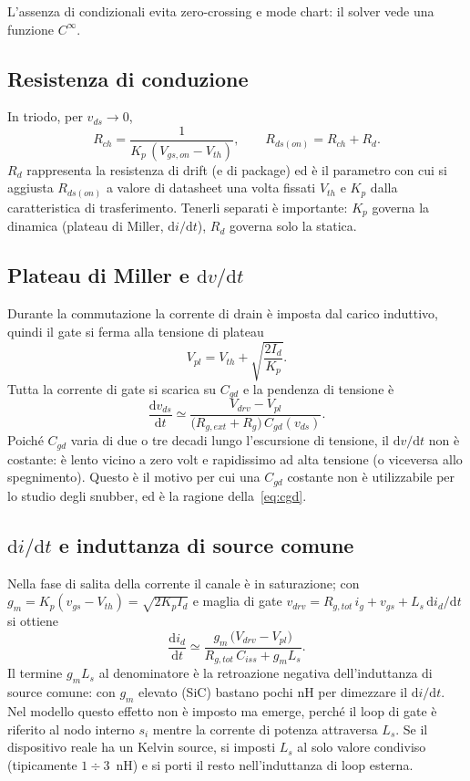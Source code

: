 \documentclass[11pt,a4paper]{article}
\newcommand{\ud}{\mathrm{d}}
\begin{document}
L'assenza di condizionali evita zero-crossing e mode chart: il solver vede
una funzione $C^\infty$.

\subsection{Resistenza di conduzione}

In triodo, per $v_{ds}\to 0$,
\begin{equation}
  R_{ch}=\frac{1}{K_p\,(V_{gs,on}-V_{th})},
  \qquad
  R_{ds(on)}=R_{ch}+R_d .
\end{equation}
$R_d$ rappresenta la resistenza di drift (e di package) ed è il parametro
con cui si aggiusta $R_{ds(on)}$ a valore di datasheet una volta fissati
$V_{th}$ e $K_p$ dalla caratteristica di trasferimento. Tenerli separati è
importante: $K_p$ governa la dinamica (plateau di Miller, $\ud i/\ud t$),
$R_d$ governa solo la statica.

\subsection{Plateau di Miller e $\ud v/\ud t$}

Durante la commutazione la corrente di drain è imposta dal carico
induttivo, quindi il gate si ferma alla tensione di plateau
\begin{equation}
  V_{pl}=V_{th}+\sqrt{\frac{2 I_d}{K_p}} .
  \label{eq:vpl}
\end{equation}
Tutta la corrente di gate si scarica su $C_{gd}$ e la pendenza di tensione è
\begin{equation}
  \frac{\ud v_{ds}}{\ud t}\simeq
  \frac{V_{drv}-V_{pl}}{\big(R_{g,ext}+R_g\big)\,C_{gd}(v_{ds})} .
  \label{eq:dvdt}
\end{equation}
Poiché $C_{gd}$ varia di due o tre decadi lungo l'escursione di tensione, il
$\ud v/\ud t$ non è costante: è lento vicino a zero volt e rapidissimo ad
alta tensione (o viceversa allo spegnimento). Questo è il motivo per cui una
$C_{gd}$ costante non è utilizzabile per lo studio degli snubber, ed è la
ragione della~\eqref{eq:cgd}.

\subsection{$\ud i/\ud t$ e induttanza di source comune}

Nella fase di salita della corrente il canale è in saturazione; con
$g_m=K_p(v_{gs}-V_{th})=\sqrt{2K_pI_d}$ e maglia di gate
$v_{drv}=R_{g,tot}\,i_g+v_{gs}+L_s\,\ud i_d/\ud t$ si ottiene
\begin{equation}
  \frac{\ud i_d}{\ud t}\simeq
  \frac{g_m\,\big(V_{drv}-V_{pl}\big)}{R_{g,tot}\,C_{iss}+g_m L_s}.
  \label{eq:didt}
\end{equation}
Il termine $g_mL_s$ al denominatore è la retroazione negativa
dell'induttanza di source comune: con $g_m$ elevato (SiC) bastano pochi nH
per dimezzare il $\ud i/\ud t$. Nel modello questo effetto non è imposto ma
emerge, perché il loop di gate è riferito al nodo interno $s_i$ mentre la
corrente di potenza attraversa $L_s$. Se il dispositivo reale ha un Kelvin
source, si imposti $L_s$ al solo valore condiviso (tipicamente
$1\div3$~nH) e si porti il resto nell'induttanza di loop esterna.
\end{document}
